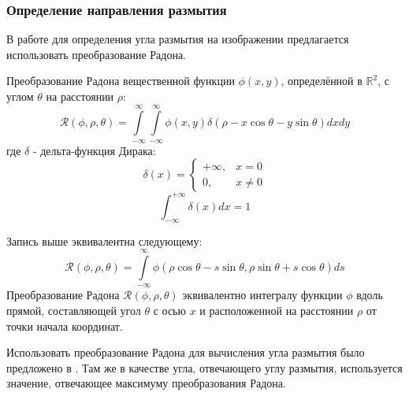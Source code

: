 \subsubsection{Определение направления размытия}

В работе для определения угла размытия на изображении предлагается использовать преобразование Радона.

Преобразование Радона вещественной функции $\phi(x, y)$,
определённой в $\mathbb{R}^{2}$, с углом $\theta$ на расстоянии $\rho$:
$$
\mathcal{R}(\phi, \rho, \theta)=\int\limits_{-\infty}^{\infty} \int\limits_{-\infty}^{\infty} \phi(x, y) 
\delta(\rho-x \cos \theta-y \sin \theta) d x d y
$$
где $\delta$ - дельта-функция Дирака:
$$\delta(x)=\left\{\begin{array}{cc}+\infty, & x=0 \\ 0, & x \neq 0\end{array}\right.$$
$$
\int_{-\infty}^{+\infty} \delta(x) d x=1
$$

Запись выше эквивалентна следующему:
$$
\mathcal{R}(\phi, \rho, \theta)=\int\limits_{-\infty}^{\infty} 
\phi(\rho \cos \theta-s \sin \theta, \rho \sin \theta+s \cos \theta) d s
$$
Преобразование Радона $\mathcal{R}(\phi, \rho, \theta)$ 
эквивалентно интегралу функции $\phi$ вдоль прямой, составляющей угол $\theta$
с осью $x$ и расположенной на расстоянии $\rho$ от точки начала координат. 

\par

Использовать преобразование Радона для вычисления угла размытия было предложено в \cite{moghaddam}. 
Там же в качестве угла, отвечающего углу размытия, используется значение, отвечающее максимуму преобразования Радона. 

